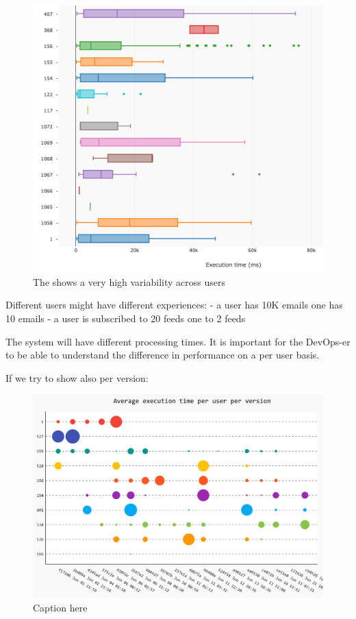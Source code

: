 \documentclass[conference]{IEEEtran}
\begin{document}
  \begin{figure}[h!]
    \centering
    \includegraphics[width=\linewidth]{time_per_user}
    \caption{The \epFeedItems shows a very high variability across users}
    \label{fig:tpu}
  \end{figure}


  Different users might have different experiences: 
  - a user has 10K emails one has 10 emails
  - a user is subscribed to 20 feeds one to 2 feeds

  The system will have different processing times. 
  It is important for the DevOps-er to be able to understand the difference in performance on a per user basis. 

  If we try to show also per version: 

  \begin{figure}[h!]
    \centering
    \includegraphics[width=\linewidth]{time_per_user_per_version}
    \caption{Caption here}
    \label{fig:figure1}
  \end{figure}
\end{document}
